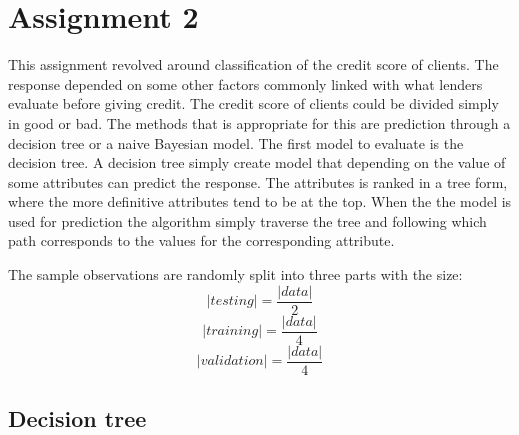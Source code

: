 \documentclass[a4paper, twocolumn]{article}
\begin{document}
    \section*{Assignment 2}
	This assignment revolved around classification of the credit score of clients. The response depended on some other factors commonly linked with what lenders evaluate before giving credit. 
	The credit score of clients could be divided simply in good or bad.\newline
    The methods that is appropriate for this are prediction through a decision tree or a naive Bayesian model. The first model to evaluate is the decision tree. A decision tree simply create  
	model that depending on the value of some attributes can predict the response. The attributes is ranked in a tree form, where the more definitive attributes tend to be at the top. When the 
	the model is used for prediction the algorithm simply traverse the tree and following which path corresponds to the values for the corresponding attribute.

	The sample observations are randomly split into three parts with the size:
	\begin{equation}
		\left | testing \right | = \frac{\left | data \right |}{2}
	\end{equation}
	\begin{equation}
		 \left | training \right | = \frac{\left | data \right |}{4}
	\end{equation}
	\begin{equation}
	 \left | validation \right | = \frac{\left | data \right |}{4}
	\end{equation}

	\subsection{Decision tree}
\end{document}
